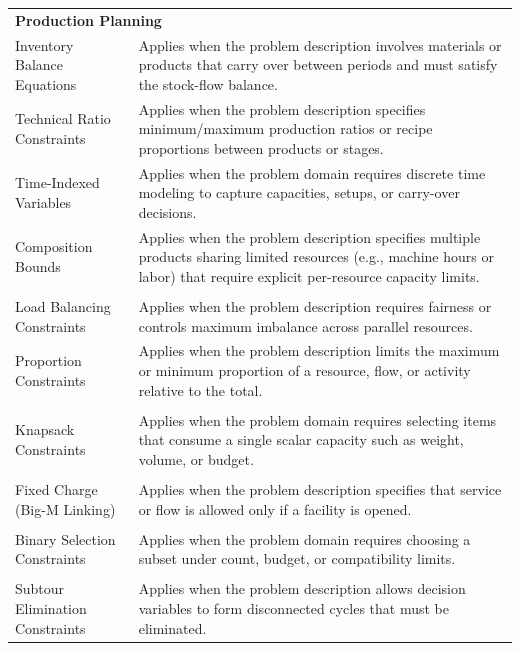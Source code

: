 \documentclass[sigconf, nonacm]{acmart}
\begin{document}
\begin{table}[!t]
\begin{tabularx}{\textwidth}{l X}
\multicolumn{2}{l}{\textbf{Production Planning}}\\
Inventory Balance Equations & Applies when the problem description involves materials or products that carry over between periods and must satisfy the stock-flow balance. \\
Technical Ratio Constraints & Applies when the problem description specifies minimum/maximum production ratios or recipe proportions between products or stages. \\
Time-Indexed Variables & Applies when the problem domain requires discrete time modeling to capture capacities, setups, or carry-over decisions. \\
Composition Bounds & Applies when the problem description specifies multiple products sharing limited resources (e.g., machine hours or labor) that require explicit per-resource capacity limits. \\
\addlinespace[2pt]

\multicolumn{2}{l}{\textbf{Balancing}}\\
Load Balancing Constraints & Applies when the problem description requires fairness or controls maximum imbalance across parallel resources. \\
Proportion Constraints & Applies when the problem description limits the maximum or minimum proportion of a resource, flow, or activity relative to the total. \\
\addlinespace[2pt]

\multicolumn{2}{l}{\textbf{Packaging}}\\
Knapsack Constraints & Applies when the problem domain requires selecting items that consume a single scalar capacity such as weight, volume, or budget. \\
\addlinespace[2pt]

\multicolumn{2}{l}{\textbf{Facility Location}}\\
Fixed Charge (Big-M Linking) & Applies when the problem description specifies that service or flow is allowed only if a facility is opened. \\
\addlinespace[2pt]

\multicolumn{2}{l}{\textbf{Selection}}\\
Binary Selection Constraints & Applies when the problem domain requires choosing a subset under count, budget, or compatibility limits. \\
\addlinespace[2pt]

\multicolumn{2}{l}{\textbf{Routing}}\\
Subtour Elimination Constraints & Applies when the problem description allows decision variables to form disconnected cycles that must be eliminated. \\

\bottomrule
\end{tabularx}
\end{table}
\end{document}
